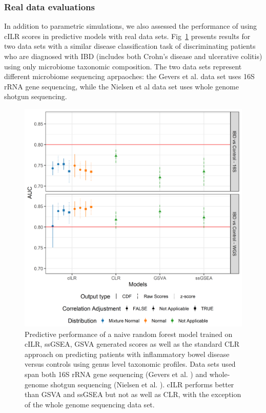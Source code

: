 \documentclass[10pt,letterpaper]{article}
\begin{document}
\subsubsection*{Real data evaluations}
In addition to parametric simulations, we also assessed the performance of using cILR scores in predictive models with real data sets. Fig~\ref{fig:7} presents results for two data sets with a similar disease classification task of discriminating patients who are diagnosed with IBD (includes both Crohn's disease and ulcerative colitis) using only microbiome taxonomic composition. The two data sets represent different microbiome sequencing aprpaoches: the Gevers et al. \cite{gevers2014} data set uses 16S rRNA gene sequencing, while the Nielsen et al \cite{nielsen2014} data set uses whole genome shotgun sequencing. 

\begin{figure}[!ht]
    \centering
    \includegraphics[scale = 0.6]{figures/data_prediction_plot.png}
    \caption{Predictive performance of a naive random forest model trained on cILR, ssGSEA, GSVA generated scores as well as the standard CLR approach on predicting patients with inflammatory bowel disease versus controls using genus level taxonomic profiles. Data sets used span both 16S rRNA gene sequencing (Gevers et al. \cite{gevers2014}) and whole-genome shotgun sequencing (Nielsen et al. \cite{nielsen2014}). cILR performs better than GSVA and ssGSEA but not as well as CLR, with the exception of the whole genome sequencing data set.}
    \label{fig:7}
\end{figure}
\end{document}
